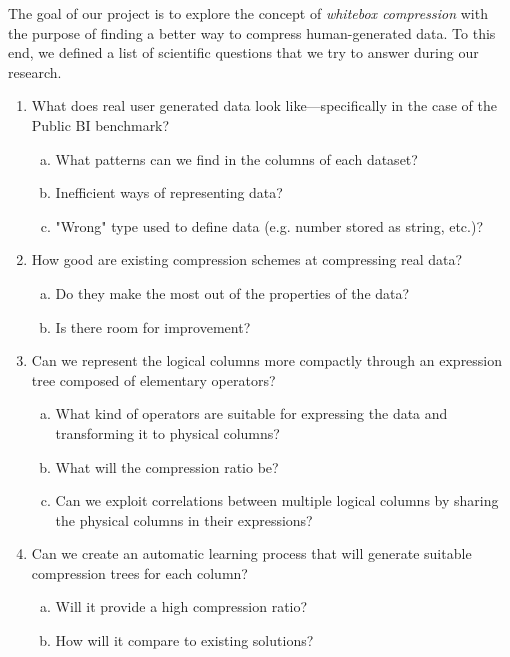 The goal of our project is to explore the concept of \emph{whitebox compression} with the purpose of finding a better way to compress human-generated data. To this end, we defined a list of scientific questions that we try to answer during our research.
\begin{enumerate}[1)]
    \item What does real user generated data look like---specifically in the case of the Public BI benchmark?
    \begin{enumerate}[a)]
        \item What patterns can we find in the columns of each dataset?
        \item Inefficient ways of representing data?
        \item "Wrong" type used to define data (e.g. number stored as string, etc.)?
    \end{enumerate}
    \item How good are existing compression schemes at compressing real data?
    \begin{enumerate}[a)]
        \item Do they make the most out of the properties of the data?
        \item Is there room for improvement?
    \end{enumerate}
    \item Can we represent the logical columns more compactly through an expression tree composed of elementary operators?
    \begin{enumerate}[a)]
        \item What kind of operators are suitable for expressing the data and transforming it to physical columns?
        \item What will the compression ratio be?
        \item Can we exploit correlations between multiple logical columns by sharing the physical columns in their expressions?
    \end{enumerate}
    \item Can we create an automatic learning process that will generate suitable compression trees for each column?
    \begin{enumerate}[a)]
        \item Will it provide a high compression ratio?
        \item How will it compare to existing solutions?
    \end{enumerate}
\end{enumerate}


